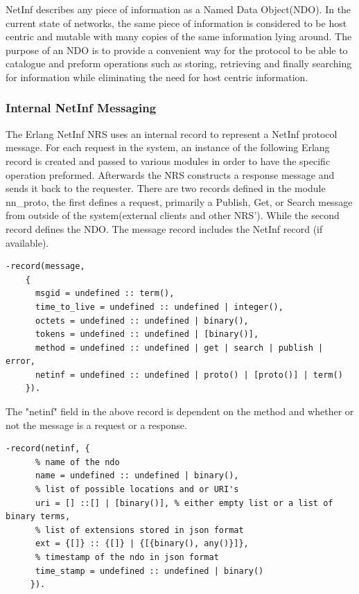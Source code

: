 NetInf describes any piece of information as a Named Data Object(NDO). In the current state of networks, the same piece of information is considered to be host centric and mutable with many copies of the same information lying around. The purpose of an NDO is to provide a convenient way for the protocol to be able to catalogue and preform operations such as storing, retrieving and finally searching for information while eliminating the need for host centric information.

\subsubsection{Internal NetInf Messaging}

The Erlang NetInf NRS uses an internal record to represent a NetInf protocol message. For each request in the system, an instance of the following Erlang record is created and passed to various modules in order to have the specific operation preformed. Afterwards the NRS constructs a response message and sends it back to the requester. There are two records defined in the module nn\_proto, the first defines a request, primarily a Publish, Get, or Search message from outside of the system(external clients and other NRS'). While the second record defines the NDO. The message record includes the NetInf record (if available). 

\label{NDO-message}
\begin{verbatim}
-record(message, 
	{
	  msgid = undefined :: term(),
	  time_to_live = undefined :: undefined | integer(),
	  octets = undefined :: undefined | binary(),
	  tokens = undefined :: undefined | [binary()],
	  method = undefined :: undefined | get | search | publish | error,
	  netinf = undefined :: undefined | proto() | [proto()] | term()
	}).
\end{verbatim}

The "netinf" field in the above record is dependent on the method and whether or not the message is a request or a response.

\begin{verbatim}
-record(netinf, {
	  % name of the ndo
	  name = undefined :: undefined | binary(),
	  % list of possible locations and or URI's
	  uri = [] ::[] | [binary()], % either empty list or a list of binary terms,
	  % list of extensions stored in json format
	  ext = {[]} :: {[]} | {[{binary(), any()}]}, 
	  % timestamp of the ndo in json format
	  time_stamp = undefined :: undefined | binary() 
	 }).
\end{verbatim}


